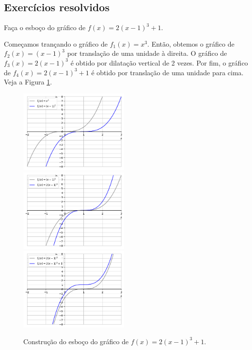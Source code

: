 \documentclass[../main.tex]{subfiles}
\begin{document}
\subsection{Exercícios resolvidos}
\begin{exeresol}
  Faça o esboço do gráfico de $f(x) = 2(x-1)^3+1$.
  \begin{resol}
  Começamos trançando o gráfico de $f_1(x) = x^3$. Então, obtemos o gráfico de $f_2(x) = (x-1)^3$ por translação de uma unidade à direita. O gráfico de $f_3(x) = 2(x-1)^3$ é obtido por dilatação vertical de 2 vezes. Por fim, o gráfico de $f_4(x) = 2(x-1)^3+1$ é obtido por translação de uma unidade para cima. Veja a Figura \ref{fig:exeresol_opfun_graf}.
  \begin{figure}[H]
    \centering
    \includegraphics[width=0.49\textwidth]{fig_func/fig_exeresol_opfun_graf_1}~
    \includegraphics[width=0.49\textwidth]{fig_func/fig_exeresol_opfun_graf_2}\\
    \includegraphics[width=0.49\textwidth]{fig_func/fig_exeresol_opfun_graf_3}
    \caption{Construção do esboço do gráfico de $f(x) = 2(x-1)^3+1$.}
    \label{fig:exeresol_opfun_graf}
  \end{figure}
\end{resol}
\end{exeresol}
\end{document}
